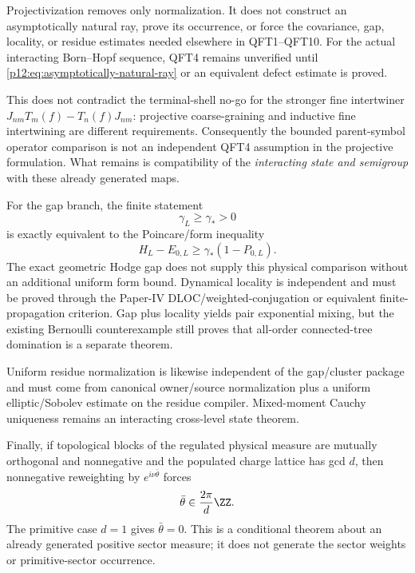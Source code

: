 \documentclass[12pt,a4paper]{article}
\begin{document}
\begin{remark}
\label{p12:rem:projective-ray-occurrence-boundary}
Projectivization removes only normalization.  It does not construct an
asymptotically natural ray, prove its occurrence, or force the covariance,
gap, locality, or residue estimates needed elsewhere in QFT1--QFT10.  For the
actual interacting Born--Hopf sequence, QFT4 remains unverified until
\eqref{p12:eq:asymptotically-natural-ray} or an equivalent defect estimate is
proved.
\end{remark}

This does not contradict the terminal-shell no-go for the stronger fine
intertwiner $J_{nm}T_m(f)-T_n(f)J_{nm}$: projective coarse-graining and
inductive fine intertwining are different requirements.  Consequently the
bounded parent-symbol operator comparison is not an independent QFT4
assumption in the projective formulation.  What remains is compatibility of
the \emph{interacting state and semigroup} with these already generated maps.

For the gap branch, the finite statement
\[
 \gamma_L\ge\gamma_*>0
\]
is exactly equivalent to the Poincare/form inequality
\[
 H_L-E_{0,L}\ge\gamma_*(1-P_{0,L}).
\]
The exact geometric Hodge gap does not supply this physical comparison without
an additional uniform form bound.  Dynamical locality is independent and must
be proved through the Paper-IV DLOC/weighted-conjugation or equivalent
finite-propagation criterion.  Gap plus locality yields pair exponential
mixing, but the existing Bernoulli counterexample still proves that all-order
connected-tree domination is a separate theorem.

Uniform residue normalization is likewise independent of the gap/cluster
package and must come from canonical owner/source normalization plus a uniform
elliptic/Sobolev estimate on the residue compiler.  Mixed-moment Cauchy
uniqueness remains an interacting cross-level state theorem.

Finally, if topological blocks of the regulated physical measure are mutually
orthogonal and nonnegative and the populated charge lattice has gcd $d$, then
nonnegative reweighting by $e^{i\nu\bar\theta}$ forces
\[
 \bar\theta\in\frac{2\pi}{d}\ZZ.
\]
The primitive case $d=1$ gives $\bar\theta=0$.  This is a conditional theorem
about an already generated positive sector measure; it does not generate the
sector weights or primitive-sector occurrence.



\end{document}
